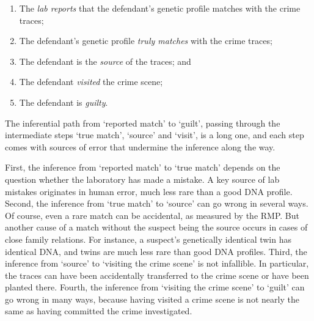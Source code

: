 \documentclass[10pt]{article}
\begin{document}
\begin{enumerate}

	\item 
The \textit{lab reports} that the defendant's 
genetic profile matches with the crime traces;

	\item 
The defendant's genetic profile \textit{truly matches} with the crime traces; 

	\item 
The defendant is the \textit{source} of the traces; and


	\item 
The defendant \textit{visited} the crime scene; 


	\item 
The defendant is \textit{guilty}.
\end{enumerate}

\noindent
The inferential path from `reported match'  
to `guilt', passing through the intermediate steps `true match', `source' and `visit', is a long one, 
and each step comes with sources of error that undermine the inference along the way.  

First, the inference from `reported match' to `true match' depends on the question whether the laboratory has made a mistake. A key source of lab mistakes originates in human error, much less rare than a good DNA profile.
Second, the inference from `true match' to `source' can go wrong in several ways. Of course, even a rare match can be accidental, as measured by the RMP. But another cause of a match without the suspect being the source occurs in cases of close family relations. For instance, a suspect's genetically identical twin has identical DNA, and twins are much less rare than good DNA profiles. 
Third, the inference from `source' to `visiting the crime scene' is not infallible. In particular, the traces can have been accidentally transferred to the crime scene or have been planted there. Fourth, the inference from `visiting the crime scene' to `guilt' can go wrong in many ways, because having visited a crime scene is not nearly the same as having committed the crime investigated.
\end{document}
